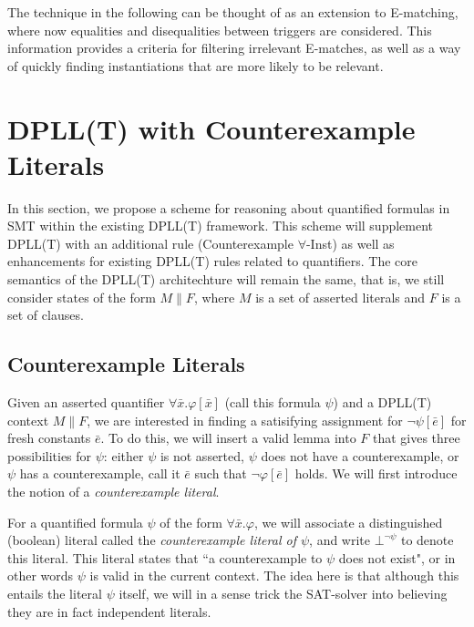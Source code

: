\documentclass{llncs}
\begin{document}
The technique in the following can be thought of as an extension to E-matching, where now equalities and disequalities between triggers are considered.
This information provides a criteria for filtering irrelevant E-matches, as well as a way of quickly finding instantiations that are more likely to be relevant.

\section{DPLL(T) with Counterexample Literals}
\label{dpll-ce-lit}

In this section, we propose a scheme for reasoning about quantified formulas in SMT within the existing DPLL(T) framework.
This scheme will supplement DPLL(T) with an additional rule (Counterexample $\forall$-Inst) as well as enhancements for existing DPLL(T) rules related to quantifiers.
The core semantics of the DPLL(T) architechture will remain the same, that is, we still consider states of the form $M \parallel F$, where $M$ is a set of asserted literals and $F$ is a set of clauses.

\begin{comment}
Throughout the remainder of this document, we will assume that CNF-conversion has been applied to the body of all universally quantified formulas.
In other words, the only quantified formulas we consider are non-ground clauses of the form $\forall \bar{x}. ( l_1 \vee \ldots \vee l_n )[\bar{x}]$, where $l_1 \ldots l_n$ are theory literals.
\end{comment}

\subsection{Counterexample Literals}

Given an asserted quantifier $\forall \bar{x}. \varphi[\bar{x}]$ (call this formula $\psi$) and a DPLL(T) context $M \parallel F$, we are interested in finding a satisifying assignment for $ \neg \psi[\bar{e}]$ for fresh constants $\bar{e}$.
To do this, we will insert a valid lemma into $F$ that gives three possibilities for $\psi$: either $\psi$ is not asserted, $\psi$ does not have a counterexample, or $\psi$ has a counterexample, call it $\bar{e}$ such that $\neg \varphi[\bar{e}]$ holds.
We will first introduce the notion of a \emph{counterexample literal}.

For a quantified formula $\psi$ of the form $\forall \bar{ x }. \varphi$, we will associate a distinguished (boolean) literal called the \emph{counterexample literal of $\psi$}, and write $\bot^{\neg \psi}$ to denote this literal.
This literal states that ``a counterexample to $\psi$ does not exist", or in other words $\psi$ is valid in the current context.
The idea here is that although this entails the literal $\psi$ itself, we will in a sense trick the SAT-solver into believing they are in fact independent literals.
\end{document}
